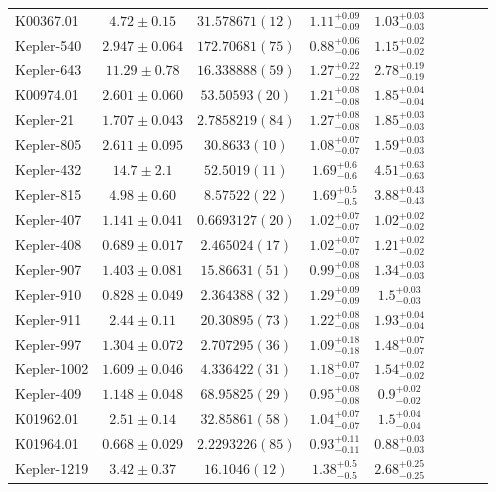 \documentclass[a4paper,fleqn,usenatbib]{mnras}
\begin{document}
\begin{table*}
\begin{tabular}{lcccccccc}
K00367.01&	$4.72 \pm 0.15$  	&$31.578671 (12)$      	&$1.11^{+0.09}_{-0.09}$	&$1.03^{+0.03}_{-0.03}$	\\
Kepler-540&	$2.947 \pm 0.064$  &$172.70681 (75)$    	&$0.88^{+0.06}_{-0.06}$	&$1.15^{+0.02}_{-0.02}$	\\
Kepler-643&	$11.29 \pm 0.78$	&$16.338888 (59)$  	    &$1.27^{+0.22}_{-0.22}$	&$2.78^{+0.19}_{-0.19}$	\\
K00974.01&	$2.601 \pm 0.060$	&$53.50593 (20) $      	&$1.21^{+0.08}_{-0.08}$	&$1.85^{+0.04}_{-0.04}$	\\
Kepler-21&	$1.707 \pm 0.043$	&$ 2.7858219 (84)$     	&$1.27^{+0.08}_{-0.08}$	&$1.85^{+0.03}_{-0.03}$ \\
Kepler-805&	$2.611 \pm 0.095$	&$30.8633 (10)$       	&$1.08^{+0.07}_{-0.07}$	&$1.59^{+0.03}_{-0.03}$	\\
Kepler-432&	$14.7 \pm 2.1$  	&$52.5019 (11)$        	&$1.69^{+0.6}_{-0.6}$	&$4.51^{+0.63}_{-0.63}$	\\
Kepler-815&	$4.98 \pm 0.60$ 	&$ 8.57522 (22)$       	&$1.69^{+0.5}_{-0.5}$	&$3.88^{+0.43}_{-0.43}$	\\
Kepler-407&	$1.141 \pm 0.041$	&$ 0.6693127 (20)$	    &$1.02^{+0.07}_{-0.07}$	&$1.02^{+0.02}_{-0.02}$	\\
Kepler-408&	$0.689 \pm 0.017$	&$ 2.465024 (17)$	    &$1.02^{+0.07}_{-0.07}$	&$1.21^{+0.02}_{-0.02}$	\\
Kepler-907&	$1.403 \pm 0.081$	&$15.86631 (51)$	    &$0.99^{+0.08}_{-0.08}$	&$1.34^{+0.03}_{-0.03}$	\\
Kepler-910&	$0.828 \pm 0.049$	&$ 2.364388 (32)$	    &$1.29^{+0.09}_{-0.09}$	&$1.5^{+0.03}_{-0.03}$	\\
Kepler-911&	$2.44 \pm 0.11$ 	&$20.30895 (73)$       	&$1.22^{+0.08}_{-0.08}$	&$1.93^{+0.04}_{-0.04}$	\\
Kepler-997&	$1.304 \pm 0.072$	&$ 2.707295 (36)$       &$1.09^{+0.18}_{-0.18}$	&$1.48^{+0.07}_{-0.07}$	\\
Kepler-1002&$1.609 \pm 0.046$	&$ 4.336422 (31)$     	&$1.18^{+0.07}_{-0.07}$	&$1.54^{+0.02}_{-0.02}$	\\
Kepler-409&	$1.148 \pm 0.048$	&$68.95825 (29)$      	&$0.95^{+0.08}_{-0.08}$	&$0.9^{+0.02}_{-0.02}$	\\
K01962.01&	$2.51 \pm 0.14$  	&$32.85861 (58)$       	&$1.04^{+0.07}_{-0.07}$	&$1.5^{+0.04}_{-0.04}$ \\
K01964.01&	$0.668 \pm 0.029$	&$ 2.2293226 (85)$     	&$0.93^{+0.11}_{-0.11}$	&$0.88^{+0.03}_{-0.03}$	\\
Kepler-1219&$3.42 \pm 0.37$ 	&$16.1046 (12)$        	&$1.38^{+0.5}_{-0.5}$	&$2.68^{+0.25}_{-0.25}$	\\

\end{tabular}
\end{table*}
\end{document}
